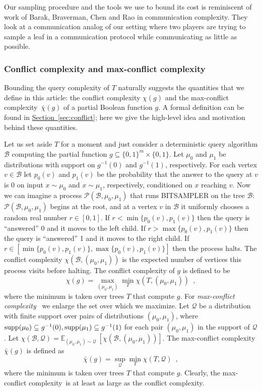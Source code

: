 \documentclass[11pt]{article}
\numberwithin{equation}{section}
\theoremstyle{definition}
\theoremstyle{plain}
\newcommand{\expref}[2]{\hyperref[#2]{#1~\ref{#2}}}
\newcommand\supp{\mathop{\rm supp}}
\newcommand{\clB}{\mathcal{B}}
\newcommand{\clQ}{\mathcal{Q}}
\newcommand{\clP}{\mathcal{P}}
\newcommand{\E}{\mathbb{E}}
\newcommand{\ccc}{max-conflict complexity}
\begin{document}
Our sampling procedure and the tools we use to bound its cost is reminiscent of work of Barak, Braverman, Chen and Rao \cite{DBLP:journals/siamcomp/BarakBCR13} in communication complexity.  
They look at a communication analog of our setting where two players are trying to sample a leaf in a communication protocol while communicating as little as possible.  
\subsubsection{Conflict complexity and \ccc}
Bounding the query complexity of $T$ naturally suggests the quantities that we define in this %
article:  %
the conflict complexity $\chi(g)$ and the \ccc \ $\bar \chi(g)$ of a partial Boolean function $g$. A formal definition can be found in \expref{Section}{sec:conflict}; here we give the high-level idea and motivation behind these quantities.  

Let us set aside $T$ for a moment and just consider a deterministic query algorithm $\clB$ computing the partial function $g \subseteq \{0,1\}^m \times \{0,1\}$.  
Let $\mu_0$
and  %
$\mu_1$ be distributions with support on 
$g^{-1}(0)$
and  %
$g^{-1}(1)$, respectively.
For each vertex $v \in \clB$ let $p_0(v)$ 
%
and $p_1(v)$   %
be the probability that the answer to the query at $v$ is 0 on 
input $x \sim \mu_0$ %
%
and $x \sim \mu_1$, respectively,  %
conditioned 
on $x$ reaching $v$.  Now we can imagine a process $\clP(\clB, \mu_0, \mu_1)$ that runs BITSAMPLER on the tree $\clB$: $\clP(\clB, \mu_0, \mu_1)$ begins at the root, and at a vertex $v$ in $\clB$ it uniformly chooses a random 
real number $r \in [0,1]$.  
If $r < \min\{p_0(v), p_1(v)\}$ then the query is 
%
%
%
``answered''   %
0 and it moves to the left child.  If $r > \max\{p_0(v), p_1(v)\}$ then the
query is %
``answered''  %
1 and it moves to the right child.  If 
$r \in [\min\{p_0(v), p_1(v)\}, \max\{p_0(v), p_1(v)\}]$ then the process halts.  The conflict complexity $\chi(\clB, (\mu_0, \mu_1))$ is the expected number of vertices this process visits before halting.  The conflict complexity of $g$ 
is defined to be 
\[
\chi(g) = \max_{(\mu_0, \mu_1)} \min_{T} \chi(T, (\mu_0, \mu_1)) \enspace,
\]
where the minimum is taken over trees $T$ that compute $g$.  
For \emph{\ccc} \ we enlarge the set over which we maximize.  Let $\clQ$ be a distribution with finite support over pairs of distributions $(\mu_0, \mu_1)$, where $\supp(\mu_0) \subseteq g^{-1}(0), \supp(\mu_1) \subseteq g^{-1}(1)$ 
for each pair $(\mu_0, \mu_1)$ in the support of $\clQ$.
Let $\chi(\clB, \clQ) = \E_{(\mu_0, \mu_1) \sim \clQ}\ [ \chi(\clB, (\mu_0, \mu_1))]$.
The max-conflict complexity $\bar \chi(g)$ is defined as 
\[
\bar \chi(g) = \sup_{\clQ} \min_{T} \chi(T, \clQ) \enspace ,
\]
where the minimum is taken over trees $T$ that compute $g$.  
Clearly, the \ccc \ is at least as large as the conflict complexity.
\end{document}
